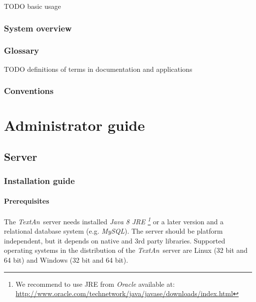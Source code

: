 \documentclass[12pt,a4paper]{report}
\newcommand{\textan}{\emph{TextAn}}
\begin{document}
TODO basic usage

\subsection{System overview}


\subsection{Glossary}

TODO definitions of terms in documentation and applications

\subsection{Conventions} %



\chapter{Administrator guide}


\section{Server}

\subsection{Installation guide}


\subsubsection{Prerequisites}
\label{sssec:SerInstPre}

The \textan\ server needs installed \emph{Java 8 JRE \footnote{We recommend to use JRE from \emph{Oracle} available at: \url{http://www.oracle.com/technetwork/java/javase/downloads/index.html}}} or a later version and a relational database system (e.g. \emph{MySQL}). The server should be platform independent, but it depends on native and 3rd party libraries. Supported operating systems in the distribution of the \textan\ server are Linux (32 bit and 64 bit) and Windows (32 bit and 64 bit).
\end{document}
